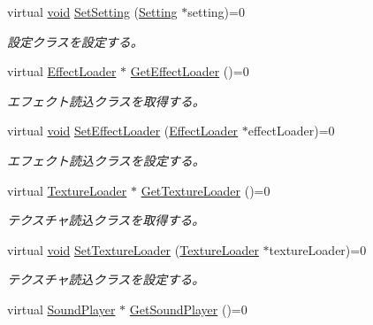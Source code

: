 \begin{DoxyCompactItemize}
virtual \mbox{\hyperlink{namespace_effekseer_ab34c4088e512200cf4c2716f168deb56}{void}} \mbox{\hyperlink{class_effekseer_1_1_manager_a4de59a95985d8042b5f82fca2c31b985}{Set\+Setting}} (\mbox{\hyperlink{class_effekseer_1_1_setting}{Setting}} $\ast$setting)=0
\begin{DoxyCompactList}\small\item\em 設定クラスを設定する。 \end{DoxyCompactList}\item 
virtual \mbox{\hyperlink{class_effekseer_1_1_effect_loader}{Effect\+Loader}} $\ast$ \mbox{\hyperlink{class_effekseer_1_1_manager_af757373ffa3cdbb1700b29c0903425d7}{Get\+Effect\+Loader}} ()=0
\begin{DoxyCompactList}\small\item\em エフェクト読込クラスを取得する。 \end{DoxyCompactList}\item 
virtual \mbox{\hyperlink{namespace_effekseer_ab34c4088e512200cf4c2716f168deb56}{void}} \mbox{\hyperlink{class_effekseer_1_1_manager_a1e183d9310c8562279707786e5503f8f}{Set\+Effect\+Loader}} (\mbox{\hyperlink{class_effekseer_1_1_effect_loader}{Effect\+Loader}} $\ast$effect\+Loader)=0
\begin{DoxyCompactList}\small\item\em エフェクト読込クラスを設定する。 \end{DoxyCompactList}\item 
virtual \mbox{\hyperlink{class_effekseer_1_1_texture_loader}{Texture\+Loader}} $\ast$ \mbox{\hyperlink{class_effekseer_1_1_manager_ae143d53bb483cb38d6371eff52d1a833}{Get\+Texture\+Loader}} ()=0
\begin{DoxyCompactList}\small\item\em テクスチャ読込クラスを取得する。 \end{DoxyCompactList}\item 
virtual \mbox{\hyperlink{namespace_effekseer_ab34c4088e512200cf4c2716f168deb56}{void}} \mbox{\hyperlink{class_effekseer_1_1_manager_a35915c6406f06e7502abed5eeba6ee51}{Set\+Texture\+Loader}} (\mbox{\hyperlink{class_effekseer_1_1_texture_loader}{Texture\+Loader}} $\ast$texture\+Loader)=0
\begin{DoxyCompactList}\small\item\em テクスチャ読込クラスを設定する。 \end{DoxyCompactList}\item 
virtual \mbox{\hyperlink{class_effekseer_1_1_sound_player}{Sound\+Player}} $\ast$ \mbox{\hyperlink{class_effekseer_1_1_manager_a2c176faba545ccc52b2255dc905f96b5}{Get\+Sound\+Player}} ()=0

\end{DoxyCompactItemize}
